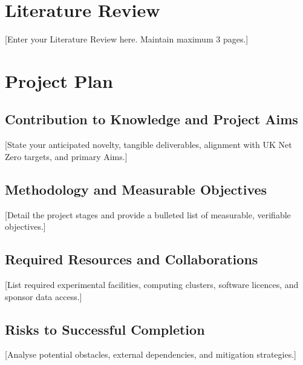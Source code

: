 \documentclass[year1]{../idcore-ar}
\author{Jane Doe}
\begin{document}
\makecoverpage

\section{Literature Review}

[Enter your Literature Review here. Maintain maximum 3 pages.]


\section{Project Plan}

\subsection{Contribution to Knowledge and Project Aims}
[State your anticipated novelty, tangible deliverables, alignment with UK Net Zero targets, and primary Aims.]

\subsection{Methodology and Measurable Objectives}
[Detail the project stages and provide a bulleted list of measurable, verifiable objectives.]

\subsection{Required Resources and Collaborations}
[List required experimental facilities, computing clusters, software licences, and sponsor data access.]

\subsection{Risks to Successful Completion}
[Analyse potential obstacles, external dependencies, and mitigation strategies.]


\newpage
\end{document}
